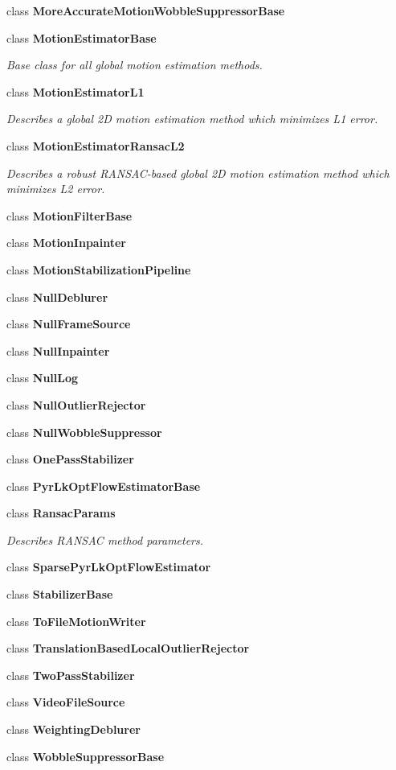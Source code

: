 \begin{DoxyCompactItemize}
class {\bfseries More\+Accurate\+Motion\+Wobble\+Suppressor\+Base}
\item 
class {\bfseries Motion\+Estimator\+Base}
\begin{DoxyCompactList}\small\item\em Base class for all global motion estimation methods. \end{DoxyCompactList}\item 
class {\bfseries Motion\+Estimator\+L1}
\begin{DoxyCompactList}\small\item\em Describes a global 2D motion estimation method which minimizes L1 error. \end{DoxyCompactList}\item 
class {\bfseries Motion\+Estimator\+Ransac\+L2}
\begin{DoxyCompactList}\small\item\em Describes a robust R\+A\+N\+S\+A\+C-\/based global 2D motion estimation method which minimizes L2 error. \end{DoxyCompactList}\item 
class {\bfseries Motion\+Filter\+Base}
\item 
class {\bfseries Motion\+Inpainter}
\item 
class {\bfseries Motion\+Stabilization\+Pipeline}
\item 
class {\bfseries Null\+Deblurer}
\item 
class {\bfseries Null\+Frame\+Source}
\item 
class {\bfseries Null\+Inpainter}
\item 
class {\bfseries Null\+Log}
\item 
class {\bfseries Null\+Outlier\+Rejector}
\item 
class {\bfseries Null\+Wobble\+Suppressor}
\item 
class {\bfseries One\+Pass\+Stabilizer}
\item 
class {\bfseries Pyr\+Lk\+Opt\+Flow\+Estimator\+Base}
\item 
class {\bfseries Ransac\+Params}
\begin{DoxyCompactList}\small\item\em Describes R\+A\+N\+S\+AC method parameters. \end{DoxyCompactList}\item 
class {\bfseries Sparse\+Pyr\+Lk\+Opt\+Flow\+Estimator}
\item 
class {\bfseries Stabilizer\+Base}
\item 
class {\bfseries To\+File\+Motion\+Writer}
\item 
class {\bfseries Translation\+Based\+Local\+Outlier\+Rejector}
\item 
class {\bfseries Two\+Pass\+Stabilizer}
\item 
class {\bfseries Video\+File\+Source}
\item 
class {\bfseries Weighting\+Deblurer}
\item 
class {\bfseries Wobble\+Suppressor\+Base}
\end{DoxyCompactItemize}
